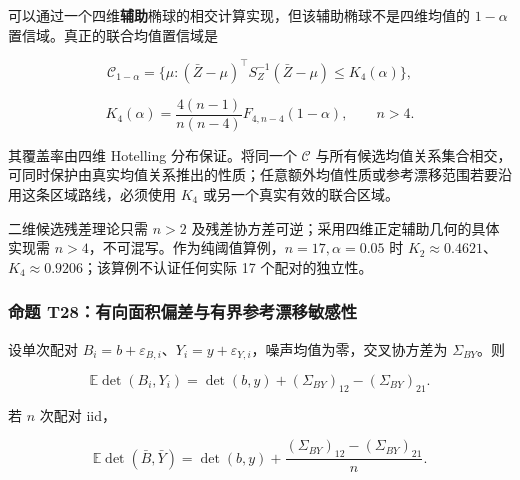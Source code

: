 \documentclass[11pt,a4paper]{article}
\begin{document}
\par
\noindent\begin{minipage}{\linewidth}

可以通过一个四维\textbf{辅助}椭球的相交计算实现，但该辅助椭球不是四维均值的
\(1-\alpha\) 置信域。真正的联合均值置信域是

\[
\mathcal C_{1-\alpha}
=\{\mu:(\bar Z-\mu)^\top S_Z^{-1}(\bar Z-\mu)\le K_4(\alpha)\},
\]

\end{minipage}\par

\[
K_4(\alpha)=\frac{4(n-1)}{n(n-4)}F_{4,n-4}(1-\alpha),
\qquad n>4.
\]

其覆盖率由四维 Hotelling 分布保证。将同一个 \(\mathcal C\)
与所有候选均值关系集合相交，可同时保护由真实均值关系推出的性质；任意额外均值性质或参考漂移范围若要沿用这条区域路线，必须使用
\(K_4\) 或另一个真实有效的联合区域。

二维候选残差理论只需 \(n>2\)
及残差协方差可逆；采用四维正定辅助几何的具体实现需
\(n>4\)，不可混写。作为纯阈值算例，\(n=17,\alpha=0.05\) 时
\(K_2\approx0.4621\)、\(K_4\approx0.9206\)；该算例不认证任何实际 17
个配对的独立性。

\subsubsection{命题
T28：有向面积偏差与有界参考漂移敏感性}\label{ux547dux9898-t28ux6709ux5411ux9762ux79efux504fux5deeux4e0eux6709ux754cux53c2ux8003ux6f02ux79fbux654fux611fux6027}

\par
\noindent\begin{minipage}{\linewidth}

设单次配对
\(B_i=b+\varepsilon_{B,i}\)、\(Y_i=y+\varepsilon_{Y,i}\)，噪声均值为零，交叉协方差为
\(\Sigma_{BY}\)。则

\[
\mathbb E\det(B_i,Y_i)
=\det(b,y)+(\Sigma_{BY})_{12}-(\Sigma_{BY})_{21}.
\]

\end{minipage}\par

\par
\noindent\begin{minipage}{\linewidth}

若 \(n\) 次配对 iid，

\[
\mathbb E\det(\bar B,\bar Y)
=\det(b,y)+\frac{(\Sigma_{BY})_{12}-(\Sigma_{BY})_{21}}n.
\]

\end{minipage}\par
\end{document}

